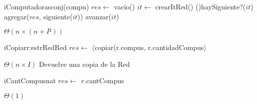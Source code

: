 \begin{Algoritmos}
  \begin{algoritmo}{iComputadoras}{}{conj(compu)}{}
    $res \gets$ vacio()
     $it \gets$ crearItRed()
    \While(){haySiguiente?($it$)}{
      agregar($res$, siguiente($it$))
      avanzar($it$)
    }
  \end{algoritmo}
  \datosAlgoritmo{} %
  {} %
  {} %
  {$\Theta(n \times (n+I²))$} %
  {} %
   
  \begin{algoritmo}{iCopiar}{\In r:estrRed}{Red}
   	$res \gets$ $\langle$copiar(r.compus, r.cantidadCompus$\rangle$
  \end{algoritmo}
  \datosAlgoritmo{} %
  {} %
  {} %
  {$\Theta(n \times I)$} %
  {Devuelve una copia de la Red} %

  \begin{algoritmo}{iCantCompus}{}{nat}
    $res \gets$ $r$.cantCompus
  \end{algoritmo}   
  \datosAlgoritmo{} %
  {} %
  {} %
  {$\Theta(1)$} %
  {} %

\end{Algoritmos}
